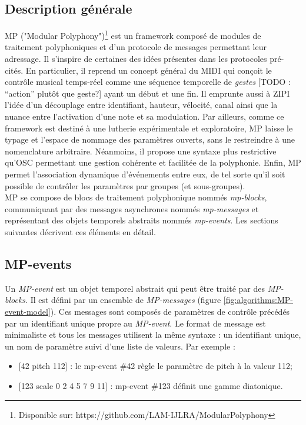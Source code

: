 \subsection{Description générale}

\noindent MP ("Modular Polyphony")\footnote{ Disponible sur: https://github.com/LAM-IJLRA/ModularPolyphony} est un framework composé de modules de traitement polyphoniques et d'un protocole de messages permettant leur adressage. Il s'inspire de certaines des idées présentes dans les protocoles pré-cités. En particulier, il reprend un concept général du \gls{MIDI} qui conçoit le contrôle musical temps-réel comme une séquence temporelle de \textit{gestes} [TODO : ``action'' plutôt que geste?] ayant un début et une fin. Il emprunte aussi à ZIPI l'idée d'un découplage entre identifiant, hauteur, vélocité, canal ainsi que la nuance entre l'activation d'une note et sa modulation. Par ailleurs, comme ce framework est destiné à une lutherie expérimentale et exploratoire, MP laisse le typage et l'espace de nommage des paramètres ouverts, sans le restreindre à une nomenclature arbitraire. Néanmoins, il propose une syntaxe plus restrictive qu'\gls{OSC} permettant une gestion cohérente et facilitée de la polyphonie. Enfin, MP permet l'association dynamique d'événements entre eux, de tel sorte qu'il soit possible de contrôler les paramètres par groupes (et sous-groupes).\\
\indent MP se compose de blocs de traitement polyphonique nommés \textit{mp-blocks}, communiquant par des messages asynchrones nommés \textit{mp-messages} et représentant des objets temporels abstraits nommés \textit{mp-events}. Les sections suivantes décrivent ces éléments en détail.


\subsection{MP-events}

\noindent Un \textit{MP-event} est un objet temporel abstrait qui peut être traité par des \textit{MP-blocks}. Il est défini par un ensemble de \textit{MP-messages} (figure \ref{fig:algorithms:MP-event-model}). Ces messages sont composés de paramètres de contrôle précédés par un identifiant unique propre au \textit{MP-event}. Le format de message est minimaliste et tous les messages utilisent la même syntaxe : un identifiant unique, un nom de paramètre suivi d'une liste de valeurs. Par exemple :
\vspace{-1em}
\begin{itemize}[noitemsep]
	\item{[42 pitch 112] : le mp-event \#42 règle le paramètre de pitch à la valeur 112;}
	\item{[123 scale 0 2 4 5 7 9 11] : mp-event \#123 définit une gamme diatonique.}
\end{itemize}

